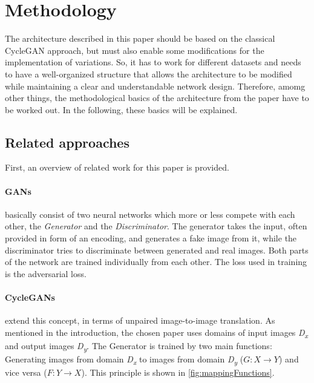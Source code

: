 \documentclass[fleqn,10pt]{SelfArx} %
\begin{document}

\section{Methodology}

The architecture described in this paper should be based on the classical Cycle\ac{GAN} approach, but must also enable some modifications for the implementation of variations. So, it has to work for different datasets and needs to have a well-organized structure that allows the architecture to be modified while maintaining a clear and understandable network design. Therefore, amomg other things, the methodological basics of the architecture from the paper have to be worked out. In the following, these basics will be explained.

\subsection{Related approaches}
First, an overview of related work for this paper is provided.

\paragraph{\acfp{GAN}} basically consist of two neural networks which more or less compete with each other, the \textit{Generator} and the \textit{Discriminator}. The generator takes the input, often provided in form of an encoding, and generates a fake image from it, while the discriminator tries to discriminate between generated and real images. Both parts of the network are trained individually from each other. The loss used in training is the adversarial loss.~\cite{Introduction-to-Cycle-GANs, GAN-Courseware}

\paragraph{Cycle\ac{GAN}s} extend this concept, in terms of unpaired image-to-image translation. As mentioned in the introduction, the chosen paper uses domains of input images \textit{D\textsubscript{x}} and output images \textit{D\textsubscript{y}}. The Generator is trained by two main functions: Generating images from domain \textit{D\textsubscript{x}} to images from domain \textit{D\textsubscript{y}} ($G: X \rightarrow Y$) and vice versa ($F: Y \rightarrow X$). This principle is shown in \autoref{fig:mappingFunctions}.~\cite{image-to-image-ccan}
\end{document}
